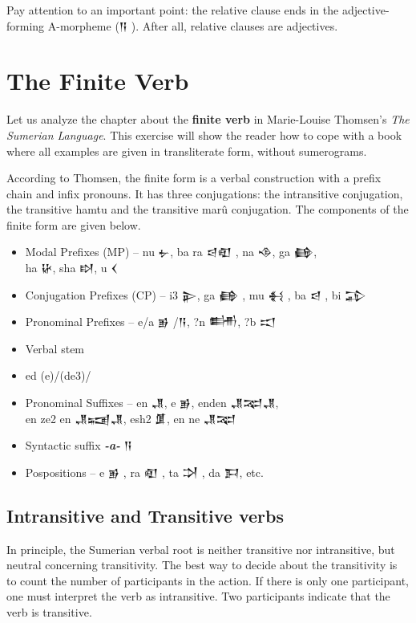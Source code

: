 \documentclass[a4paper,12pt]{book}
\newcommand{\fcn}{\setmainfont{Akkadian.otf}}
\begin{document}
Pay attention to an important point:
the relative clause ends
in the adjective-forming A-morpheme ({\fcn 𒀀} ).
After all, relative clauses are adjectives.

\chapter{The Finite Verb}
Let us analyze the chapter about
the {\bf finite verb} in Marie-Louise
Thomsen's {\em The Sumerian Language}.
This exercise will show the reader
how to cope with a book where all
examples are given in transliterate
form, without sumerograms.

According to Thomsen, the finite form
is a verbal construction with a
prefix chain and infix pronouns.
It has three conjugations: the intransitive
conjugation, the transitive hamtu
and the transitive marû conjugation.
The components of the finite form
are given below.

\begin{itemize}
\item Modal Prefixes (MP) -- nu {\fcn 𒉡},
  ba ra {\fcn 𒁀𒊏} , na {\fcn 𒈾}, ga {\fcn 𒂵},\\
  ha {\fcn 𒄩}, sha {\fcn 𒊭}, u {\fcn 𒌋}
\item Conjugation Prefixes (CP) -- i3 {\fcn 𒉌},
  ga {\fcn 𒂵} , mu {\fcn 𒈬} , ba {\fcn 𒁀} , bi {\fcn 𒁉} 
\item Pronominal Prefixes -- e/a {\fcn 𒂊} /{\fcn 𒀀},
  ?n {\fcn 𒌦}, ?b {\fcn 𒀊}
\item Verbal stem
\item ed (e)/(de3)/
\item Pronominal Suffixes -- en {\fcn 𒂗},
  e {\fcn 𒂊}, enden {\fcn 𒂗𒉈𒂗},\\
  en ze2 en {\fcn 𒂗𒍢𒂗}, esh2 {\fcn 𒂠},
  en ne {\fcn 𒂗𒉈}
\item Syntactic suffix {\bf\em -a-} {\fcn 𒀀}
\item Pospositions -- e {\fcn 𒂊} , ra {\fcn 𒊏} ,
  ta {\fcn 𒋫} , da {\fcn 𒁕}, etc.
\end{itemize}

\section{Intransitive and Transitive verbs}
In principle, the Sumerian verbal root is
neither transitive nor intransitive,
but neutral concerning transitivity.
The best way to decide about the
transitivity is to count the number
of participants in the action.
If there is only one participant,
one must interpret the verb as
intransitive. Two participants
indicate that the verb is transitive.\\
\end{document}
